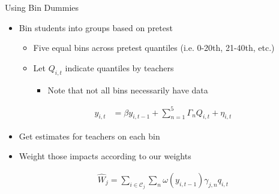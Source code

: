 \documentclass[t,aspectratio=169,11pt]{beamer}
\begin{document}


\begin{frame}{Using Bin Dummies}

\begin{itemize}
    \item Bin students into groups based on pretest
        \begin{itemize}
        \item Five equal bins across pretest quantiles (i.e. 0-20th, 21-40th, etc.)
        \item Let $Q_{i,t}$ indicate quantiles by teachers
        \begin{itemize}
          \item Note that not all bins necessarily have data 
        \end{itemize}
        \end{itemize}
     \begin{align*}
    y_{i,t}  &= \beta y_{i,t-1} + \sum_{n=1}^{5} \Gamma_n Q_{i,t} + \eta_{i,t}
    \end{align*}
    
    \item Get estimates for teachers on each bin 
    
    \item Weight those impacts according to our weights 
    
      \begin{align*}
    \hat{W}_j = \sum_{i\in \mathcal{C}_j} \sum_n \omega(y_{i,t-1}) \gamma_{j,n} q_{i,t}
    \end{align*}
    
\end{itemize}



\end{frame}
\end{document}
